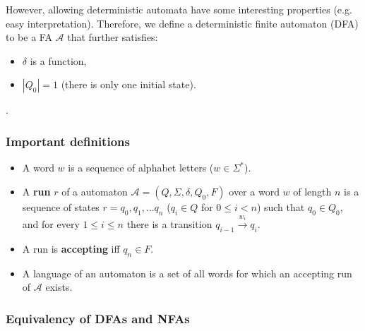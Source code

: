 \documentclass{beamer}
\newcommand{\transition}[3]{\ensuremath{#1 \overset{#2 }{\longrightarrow} #3}}
\begin{document}
    \begin{frame}
        However, allowing deterministic automata have some interesting properties (e.g. easy interpretation).
        Therefore, we define a deterministic finite automaton (DFA) to be a FA $\mathcal{A}$ that further satisfies:
        \begin{itemize}
            \item $\delta$ is a function,
            \item $|Q_0| = 1$ (there is only one initial state).
        \end{itemize}.
    \end{frame}

    \begin{frame}
        \frametitle{Important definitions}
        \begin{itemize}
            \item A word $w$ is a sequence of alphabet letters ($w \in \Sigma^*$).
            \pause

            \item A \textbf{run} $r$ of a automaton $\mathcal{A} = (Q, \Sigma,
                \delta, Q_0, F)$ over a word $w$ of length $n$ is a sequence of
                states $r = q_0, q_1, \dots q_n$ ($q_i \in Q$ for $0 \le i < n$)
                such that $q_0 \in Q_0$, and for every $1 \le i \le n$ there is
                a transition $\transition{q_{i-1}}{w_i}{q_i}$.  \item A run is
                    \textbf{accepting} iff $q_n \in F$.  \pause

            \item A language of an automaton is a set of all words for which an accepting run of $\mathcal{A}$ exists.
        \end{itemize} 
    \end{frame}

    \begin{frame}
        \frametitle{Equivalency of DFAs and NFAs}
    \end{frame}
\end{document}
